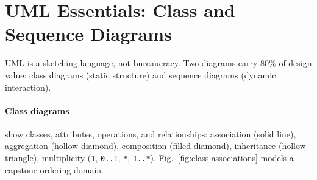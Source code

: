 \section{UML Essentials: Class and Sequence Diagrams}
\label{sec:uml-essentials}
UML is a sketching language, not bureaucracy. Two diagrams carry 80\% of design value: class diagrams (static structure) and sequence diagrams (dynamic interaction).

\paragraph{Class diagrams} show classes, attributes, operations, and relationships: association (solid line), aggregation (hollow diamond), composition (filled diamond), inheritance (hollow triangle), multiplicity (\texttt{1}, \texttt{0..1}, \texttt{*}, \texttt{1..*}). Fig.~\ref{fig:class-associations} models a capstone ordering domain.

